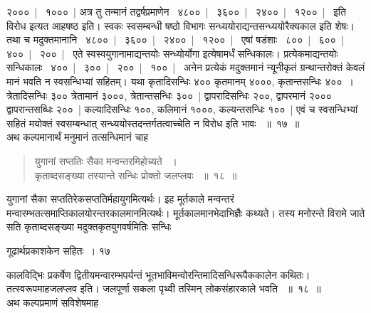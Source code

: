 \documentclass[11pt, openany]{book}
\begin{document}
\begin{sloppypar}
\noindent २०००~|~ १०००~| अत्र तु तन्मानं तद्वर्षप्रमाणेन ~४८००~|~ ३६००~|~ २४००~|~ १२००~|~ इति विरोध इत्यत आह\textendash षष्ठ इति। स्वकः स्वसम्बन्धी षष्ठो विभागः सन्ध्ययोराद्यन्तसन्ध्ययोरैक्यकाल इति शेषः। तथा च मदुक्तमानानि ~४८००~|~ ३६००~|~ २४००~|~ १२००~|~ एषां षडंशाः ~८००~|~ ६००~|~ ४००~|~ २००~|~ एते स्वस्वयुगानामाद्यन्तयोः सन्ध्योर्योगा इत्येषामर्धं सन्धिकालः। प्रत्येकमाद्यन्तयोः सन्धिकालः ~४००~|~ ३००~|~ २००~|~ १००~|~ अनेन प्रत्येकं मदुक्तमानं न्यूनीकृतं ग्रन्थान्तरोक्तं केवलं मानं भवति न स्वसन्धिभ्यां सहितम्। यथा कृतादिसन्धिः ४०० कृतमानम् ४०००, कृतान्तसन्धिः ४००~। त्रेतादिसन्धिः ३०० त्रेतामानं ३०००, त्रेतान्तसन्धिः ३००~| द्वापरादिसन्धिः २००, द्वापरमानं २००० द्वापरान्तसब्धिः २००~| कल्यादिसन्धिः १००, कलिमानं १०००, कल्यन्तसन्धिः १००~| एवं च स्वसन्धिभ्यां सहितं मयोक्तं स्वसम्बन्धात् सन्ध्ययोस्तदन्तर्गतत्वाच्चेति न विरोध इति भावः ~॥~१७~॥\\ 
\noindent अथ कल्पमानार्थं मनुमानं तत्सन्धिमानं चाह\textendash
\end{sloppypar}
\begin{quote}

 {\ssi युगानां सप्ततिः सैका मन्वन्तरमिहोच्यते ~।\\
कृताब्दसङ्ख्या तस्यान्ते सन्धिः प्रोक्तो जलप्लवः ~॥~१८~॥}
\end{quote}
\begin{sloppypar}
 युगानां सैका सप्ततिरेकसप्ततिर्महायुगमित्यर्थः। इह मूर्तकाले मन्वन्तरं मन्वारम्भतत्समाप्तिकालयोरन्तरकालमानमित्यर्थः। मूर्तकालमानभेदाभिज्ञैः कथ्यते। तस्य मनोरन्ते विरामे जाते सति कृताब्दसङ्ख्या मदुक्तकृतयुगवर्षमितिः सन्धिः
\end{sloppypar}

\newpage


\hspace{3cm} गूढार्थप्रकाशकेन सहितः~। \hfill १७
 \vspace{1cm}

कालविद्भिः प्रकर्षेण द्वितीयमन्वारम्भपर्यन्तं भूतभाविमन्वोरन्तिमादिसन्धिरूपैककालेन कथितः। तत्स्वरूपमाह\textendash जलप्लव इति। जलपूर्णा सकला पृथ्वी तस्मिन् लोकसंहारकाले भवति ~॥~१८~॥\\
\noindent अथ कल्पप्रमाणं सविशेषमाह\textendash
\end{document}

